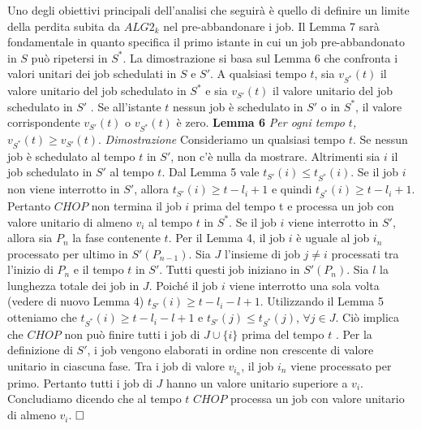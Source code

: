 \documentclass[twoside,openany,titlepage,fleqn,
	headinclude,12pt,a4paper,BCOR5mm,footinclude]{scrbook}
\begin{document}
Uno degli obiettivi principali dell'analisi che seguirà è quello di definire un limite della perdita subita da $ALG2_{k}$ nel pre-abbandonare i job. Il Lemma 7 sarà fondamentale in quanto specifica il primo istante in cui un job pre-abbandonato in $S$ può ripetersi in $S^{*}$. La dimostrazione si basa sul Lemma 6 che confronta i valori unitari dei job schedulati in $S$ e $S'$. A qualsiasi tempo $t$, sia $v_{S^{*}}(t)$ il valore unitario del job schedulato in $S^{*}$ e sia $v_{S'}(t)$ il valore unitario del job schedulato in $S'$ . Se all'istante $t$ nessun job è schedulato in $S'$ o in $S^{*}$, il valore corrispondente $v_{S'}(t)$ o $v_{S^{*}}(t)$ è zero.
\newline \newline
\textbf{Lemma 6}
\textit{Per ogni tempo $t$, $v_{S^{*}}(t) \geq v_{S'}(t).$}
\newline \newline
\textit{Dimostrazione}
Consideriamo un qualsiasi tempo $t$. Se nessun job è schedulato al tempo $t$ in $S'$, non c'è nulla da mostrare. Altrimenti sia $i$ il job schedulato in $S'$ al tempo $t$. Dal Lemma 5 vale $t_{S'}(i) \leq t_{S^{*}}(i)$. Se il job $i$ non viene interrotto in $S'$, allora $t_{S'}(i) \geq t - l_{i} + 1$ e quindi $t_{S^{*}}(i) \geq t - l_{i} +1$. Pertanto $CHOP$ non termina il job $i$ prima del tempo t e processa un job con valore unitario di almeno $v_{i}$ al tempo $t$ in $S^{*}$. Se il job $i$ viene interrotto in $S'$, allora sia $P_{n}$ la fase contenente $t$. Per il Lemma 4, il job $i$ è uguale al job $i_{n}$ processato per ultimo in $S'(P_{n - 1})$. Sia $J$ l'insieme di job $j \ne i$ processati tra l'inizio di $P_{n}$ e il tempo $t$ in $S'$. Tutti questi job iniziano in $S'(P_{n})$. Sia $l$ la lunghezza totale dei job in $J$. Poiché il job $i$ viene interrotto una sola volta (vedere di nuovo Lemma 4) $t_{S'}(i) \geq t - l_{i} - l + 1$. Utilizzando il Lemma 5 otteniamo che $t_{S^{*}}(i) \geq t - l_{i} - l + 1$ e $t_{S'}(j) \leq t_{S^{*}}(j)$, $\forall j \in J$. Ciò implica che $CHOP$ non può finire tutti i job di $J \cup \{i\}$ prima del tempo $t$ . Per la definizione di $S'$, i job vengono elaborati in ordine non crescente di valore unitario in ciascuna fase. Tra i job di valore $v_{i_{n}}$, il job $i_{n}$ viene processato per primo. Pertanto tutti i job di $J$ hanno un valore unitario superiore a $v_{i}$. Concludiamo dicendo che al tempo $t$ $CHOP$ processa un job con valore unitario di almeno $v_{i}$. $\hfill \square$
\newline \newline
\end{document}
